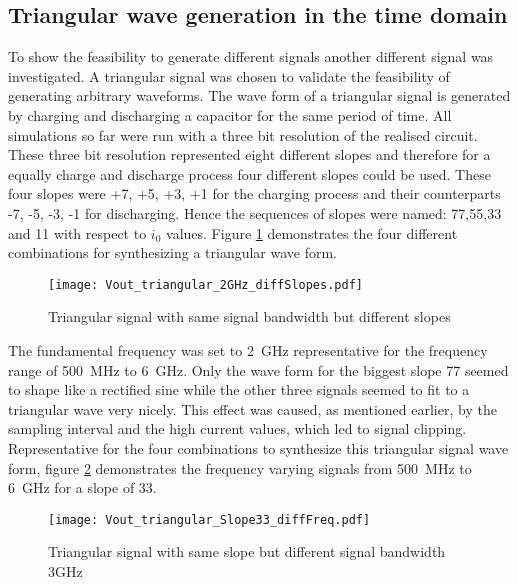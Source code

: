 \subsection{Triangular wave generation in the time domain}
To show the feasibility to generate different signals another different signal was investigated.
A triangular signal was chosen to validate the feasibility of generating arbitrary waveforms.
The wave form of a triangular signal is generated by charging and discharging a capacitor for the same period of time.
All simulations so far were run with a three bit resolution of the realised circuit.
These three bit resolution represented eight different slopes and therefore for a equally charge and discharge process four different slopes could be used.
These four slopes were +7, +5, +3, +1 for the charging process and their counterparts -7, -5, -3, -1 for discharging.
Hence the sequences of slopes were named: 77,55,33 and 11 with respect to $i_0$ values.
Figure \ref{fig:DiffSlopeSameBWTriangular} demonstrates the four different combinations for synthesizing a triangular wave form.

\begin{figure}[htb!]
	\centering
  \texttt{[image: Vout\_triangular\_2GHz\_diffSlopes.pdf]}
	\caption{Triangular signal with same signal bandwidth but different slopes}
	\label{fig:DiffSlopeSameBWTriangular}
\end{figure}

The fundamental frequency was set to \SI{2}{\giga \hertz} representative for the frequency range of \SI{500}{\mega \hertz} to \SI{6}{\giga \hertz}.
Only the wave form for the biggest slope 77 seemed to shape like a rectified sine while the other three signals seemed to fit to a triangular wave very nicely.
This effect was caused, as mentioned earlier, by the sampling interval and the high current values, which led to signal clipping.
Representative for the four combinations to synthesize this triangular signal wave form, 
figure \ref{fig:DiffSigBWSameSlopeTriangular} demonstrates the frequency varying signals from \SI{500}{\mega \hertz} to \SI{6}{\giga \hertz} for a slope of 33.


\begin{figure}[htb!]
	\centering
  \texttt{[image: Vout\_triangular\_Slope33\_diffFreq.pdf]}
	\caption{Triangular signal with same slope but different signal bandwidth 3GHz}
	\label{fig:DiffSigBWSameSlopeTriangular}
\end{figure}


